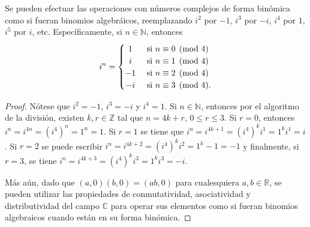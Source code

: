 

\begin{proposition}
Se pueden efectuar las operaciones con números complejos de forma binómica como si fueran binomios algebráicos, reemplazando $i^2$ por $-1$, $i^3$ por $-i$, $i^4$ por $1$, $i^5$ por $i$, etc. Específicamente, si $n \in \mathbb{N}$, entonces
\begin{equation*}
    i^n = \begin{cases}
        \hfil 1 & \text{ si } n \equiv 0 \pmod{4} \\
        \hfil i & \text{ si } n \equiv 1 \pmod{4} \\
        \hfil -1 & \text{ si } n \equiv 2 \pmod{4} \\
        \hfil -i & \text{ si } n \equiv 3 \pmod{4}.
    \end{cases}
\end{equation*}
\end{proposition}

\begin{proof}
Nótese que $i^2 = -1$, $i^3 = -i$ y $i^4 = 1$. Si $n \in \mathbb{N}$, entonces por el algoritmo de la división, existen $k, r \in \mathbb{Z}$ tal que $n = 4k + r$, $0 \le r \le 3$. Si $r=0$, entonces $i^n = i^{4n} = (i^4)^n = 1^n = 1$. Si $r=1$ se tiene que $i^n = i^{4 k + 1} = (i^4)^k i^1 = 1^k i^1 = i$. Si $r=2$ se puede escribir $i^n = i^{4 k + 2} = (i^4)^k i^2 = 1^k -1 = -1$ y finalmente, si $r = 3$, se tiene $i^n = i^{4 k + 3} = (i^4)^k i^3 = 1^k i^3 = -i$.
\bigskip

Más aún, dado que $(a,0)(b,0) = (a b,0)$ para cualesquiera $a,b \in \mathbb{R}$, se pueden utilizar las propiedades de conmutatividad, asociatividad y distributividad del campo $\mathbb{C}$ para operar sus elementos como si fueran binomios algebraicos cuando están en su forma binómica.
\end{proof}
